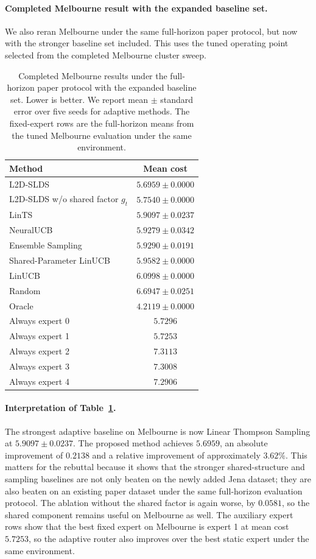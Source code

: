 \documentclass[11pt]{article}
\begin{document}
\paragraph{Completed Melbourne result with the expanded baseline set.}
We also reran Melbourne under the same full-horizon paper protocol, but now with the stronger baseline set included. This uses the tuned operating point selected from the completed Melbourne cluster sweep.

\begin{table}[h]
\centering
\caption{Completed Melbourne results under the full-horizon paper protocol with the expanded baseline set. Lower is better. We report mean $\pm$ standard error over five seeds for adaptive methods. The fixed-expert rows are the full-horizon means from the tuned Melbourne evaluation under the same environment.}
\label{tab:melbourne_response}
\begin{tabular}{lc}
\toprule
\textbf{Method} & \textbf{Mean cost} \\
\midrule
L2D-SLDS & $5.6959 \pm 0.0000$ \\
L2D-SLDS w/o shared factor $g_t$ & $5.7540 \pm 0.0000$ \\
LinTS & $5.9097 \pm 0.0237$ \\
NeuralUCB & $5.9279 \pm 0.0342$ \\
Ensemble Sampling & $5.9290 \pm 0.0191$ \\
Shared-Parameter LinUCB & $5.9582 \pm 0.0000$ \\
LinUCB & $6.0998 \pm 0.0000$ \\
Random & $6.6947 \pm 0.0251$ \\
Oracle & $4.2119 \pm 0.0000$ \\
\midrule
Always expert 0 & $5.7296$ \\
Always expert 1 & $5.7253$ \\
Always expert 2 & $7.3113$ \\
Always expert 3 & $7.3008$ \\
Always expert 4 & $7.2906$ \\
\bottomrule
\end{tabular}
\end{table}

\paragraph{Interpretation of Table~\ref{tab:melbourne_response}.}
The strongest adaptive baseline on Melbourne is now Linear Thompson Sampling at $5.9097 \pm 0.0237$. The proposed method achieves $5.6959$, an absolute improvement of $0.2138$ and a relative improvement of approximately $3.62\%$. This matters for the rebuttal because it shows that the stronger shared-structure and sampling baselines are not only beaten on the newly added Jena dataset; they are also beaten on an existing paper dataset under the same full-horizon evaluation protocol. The ablation without the shared factor is again worse, by $0.0581$, so the shared component remains useful on Melbourne as well. The auxiliary expert rows show that the best fixed expert on Melbourne is expert 1 at mean cost $5.7253$, so the adaptive router also improves over the best static expert under the same environment.
\end{document}
